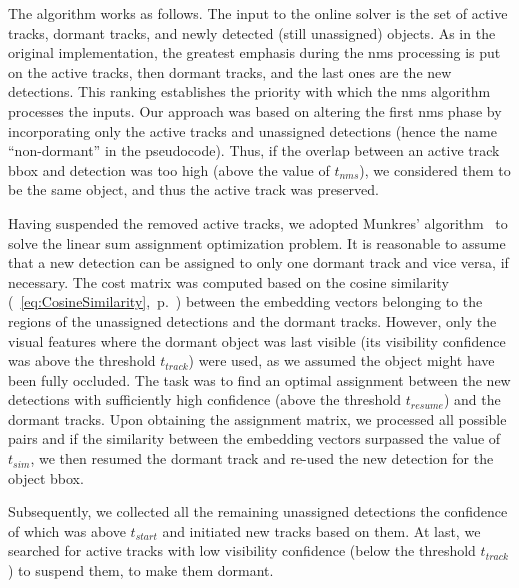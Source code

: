 The algorithm works as follows. The input to the online solver is the set of active tracks, dormant tracks, and newly detected (still unassigned) objects. As in the original implementation, the greatest emphasis during the \gls{nms} processing is put on the active tracks, then dormant tracks, and the last ones are the new detections. This ranking establishes the priority with which the \gls{nms} algorithm processes the inputs. Our approach was based on altering the first \gls{nms} phase by incorporating only the active tracks and unassigned detections (hence the name ``non-dormant'' in the pseudocode). Thus, if the overlap between an active track \gls{bbox} and detection was too high (above the value of $t_{nms}$), we considered them to be the same object, and thus the active track was preserved.

Having suspended the removed active tracks, we adopted Munkres' algorithm~\cite{munkres1957assignment} to solve the linear sum assignment optimization problem. It is reasonable to assume that a new detection can be assigned to only one dormant track and vice versa, if necessary. The cost matrix was computed based on the cosine similarity (\eqtext{}~\ref{eq:CosineSimilarity},~p.~\pageref{eq:CosineSimilarity}) between the embedding vectors belonging to the regions of the unassigned detections and the dormant tracks. However, only the visual features where the dormant object was last visible (its visibility confidence was above the threshold $t_{track}$) were used, as we assumed the object might have been fully occluded. The task was to find an optimal assignment between the new detections with sufficiently high confidence (above the threshold $t_{resume}$) and the dormant tracks. Upon obtaining the assignment matrix, we processed all possible pairs and if the similarity between the embedding vectors surpassed the value of $t_{sim}$, we then resumed the dormant track and re-used the new detection for the object \gls{bbox}.

Subsequently, we collected all the remaining unassigned detections the confidence of which was above $t_{start}$ and initiated new tracks based on them. At last, we searched for active tracks with low visibility confidence (below the threshold $t_{track}$) to suspend them, to make them dormant.


